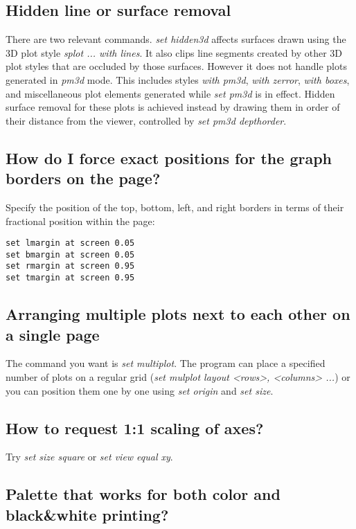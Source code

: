 \documentclass[a4paper,11pt]{article}
\begin{document}
\subsection{Hidden line or surface removal}

There are two relevant commands. {\em set hidden3d} affects surfaces
drawn using the 3D plot style {\em splot ... with lines}. It also clips
line segments created by other 3D plot styles that are occluded by those
surfaces.   However it does not handle plots generated in {\em pm3d} mode.
This includes styles {\em with pm3d}, {\em with zerror}, {\em with boxes},
and miscellaneous plot elements generated while {\em set pm3d} is in effect.
Hidden surface removal for these plots is achieved instead by drawing them
in order of their distance from the viewer, controlled by
{\em set pm3d depthorder}.

\subsection{How do I force exact positions for the graph borders on the page?}

Specify the position of the top, bottom, left, and right borders in
terms of their fractional position within the page:

\small
\begin{verbatim}
set lmargin at screen 0.05
set bmargin at screen 0.05
set rmargin at screen 0.95
set tmargin at screen 0.95
\end{verbatim}
\normalsize

\subsection{Arranging multiple plots next to each other on a single page}

The command you want is {\em set multiplot}.  The program can place
a specified number of plots on a regular grid
({\em set mulplot layout <rows>, <columns> ...}) or you can position them
one by one using {\em set origin} and {\em set size}.

\subsection{How to request 1:1 scaling of axes?}

Try {\em set size square} or {\em set view equal xy}.

\subsection{Palette that works for both color and black\&white printing?}
\end{document}
